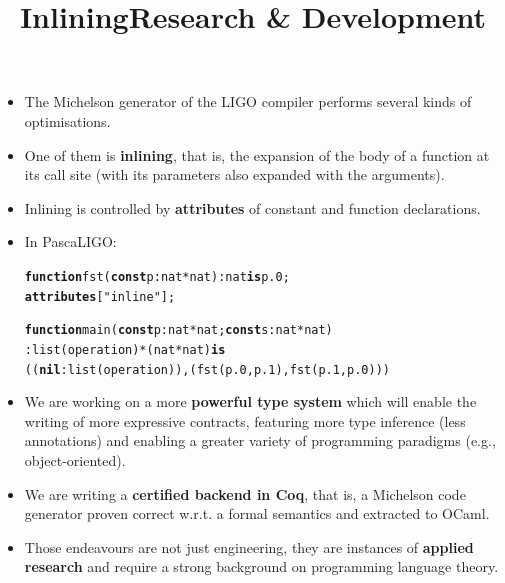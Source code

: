 \documentclass[wide]{slides}
\newcommand{\Kattributes}[0]{\textbf{attributes}\xspace}
\newcommand{\Kconst}[0]{\textbf{const}\xspace}
\newcommand{\Kfunction}[0]{\textbf{function}\xspace}
\newcommand{\Kis}[0]{\textbf{is}\xspace}
\newcommand{\Knil}[0]{\textbf{nil}\xspace}
\begin{document}
\begin{slide}
  \title{Inlining}

  \begin{itemize}

    \item The Michelson generator of the LIGO compiler performs
      several kinds of optimisations.

    \item One of them is \textbf{inlining}, that is, the expansion of
      the body of a function at its call site (with its parameters
      also expanded with the arguments).

    \item Inlining is controlled by \textbf{attributes} of constant
      and function declarations.

    \item In PascaLIGO:
      \begin{alltt}
\Kfunction fst (\Kconst p : nat * nat) : nat \Kis p.0;
\Kattributes ["inline"];

\Kfunction main (\Kconst p : nat * nat; \Kconst s : nat * nat)
  : list (operation) * (nat * nat) \Kis
  ((\Knil : list (operation)), (fst (p.0,p.1), fst (p.1,p.0)))
      \end{alltt}

  \end{itemize}

\end{slide}

\begin{slide}
  \title{Research \& Development}

  \begin{itemize}

    \item We are working on a more \textbf{powerful type system} which
      will enable the writing of more expressive contracts, featuring
      more type inference (less annotations) and enabling a greater
      variety of programming paradigms (e.g., object-oriented).

    \item We are writing a \textbf{certified backend in Coq}, that is,
      a Michelson code generator proven correct w.r.t. a formal
      semantics and extracted to OCaml.

    \item Those endeavours are not just engineering, they are
      instances of \textbf{applied research} and require a strong
      background on programming language theory.

  \end{itemize}

\end{slide}
\end{document}

